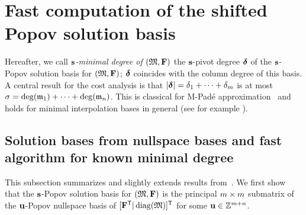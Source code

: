 \documentclass[preprint]{sig-alternate-05-2015}
\begin{document}
\section{Fast computation of the shifted Popov solution basis}
\label{sec:modsys}

Hereafter, we call \emph{$\shifts$-minimal degree of $(\Modulus,\sys)$} the
$\shifts$-pivot degree $\minDegs$ of the $\shifts$-Popov solution basis for
$(\Modulus,\sys)$; $\minDegs$ coincides with the column degree of this basis. A
central result for the cost analysis is that $\sumVec{\minDegs} = \minDeg_1 +
\cdots + \minDeg_\rdim$ is at most $\degMod = \deg(\modulus_1) + \cdots +
\deg(\modulus_\nbeq)$. This is classical for M-Pad\'e
approximation~\cite[Theorem~4.1]{BarBul92} and holds for minimal interpolation
bases in general (see for example \cite[Lemma~7.17]{JeNeScVi15}).

\subsection{Solution bases from nullspace bases and fast algorithm for known
minimal degree}
\label{subsec:mnb_solbas_knownmindeg}

This subsection summarizes and slightly extends results from~\cite[Section
3]{GupSto11}. We first show that the $\shifts$-Popov solution basis for
$(\Modulus,\sys)$ is the principal $\nbun \times \nbun$ submatrix of the
$\shifts[u]$-Popov nullspace basis of $\trsp{ [ \trsp{\sys} | \diag{\Modulus} ]
}$ for some $\shifts[u] \in \shiftSpace[\nbun+\nbeq]$.
\end{document}
